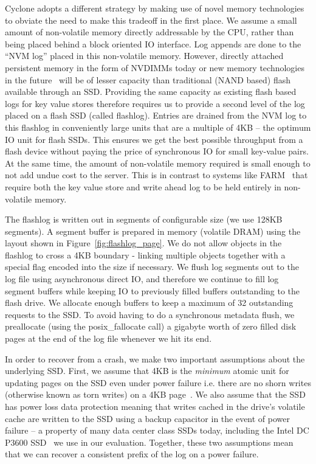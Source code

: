 \documentclass[twocolumn]{article}
\begin{document}
Cyclone adopts a different strategy by making use of novel memory technologies
to obviate the need to make this tradeoff in the first place. We assume a small
amount of non-volatile memory directly addressable by the CPU, rather than being
placed behind a block oriented IO interface. Log appends are done to the ``NVM
log'' placed in this non-volatile memory. However, directly attached persistent 
memory in the form of NVDIMMs today or new memory technologies in the
future~\cite{pmfs} will be of lesser capacity than traditional (NAND based)
flash available through an
SSD. Providing the same capacity as existing flash based logs for key value
stores therefore requires us to provide a second level of the log
placed on a flash SSD (called flashlog).  Entries are drained from
the NVM log to this flashlog in conveniently large units that are a multiple of
4KB -- the optimum IO unit for flash SSDs. This ensures we get the best possible
throughput from a flash device without paying the price of synchronous IO for
small key-value pairs. At the same time, the amount of non-volatile memory
required is small enough to not add undue cost to the server. This is in contrast to
systems like FARM~\cite{farm} that require both the key value store and write ahead log
to be held entirely in non-volatile memory.

The flashlog is written out in segments of configurable size (we use 128KB
segments). A segment buffer is prepared in memory (volatile DRAM) using the
layout shown in Figure~\ref{fig:flashlog_page}. We do not allow objects in the
flashlog to cross a 4KB boundary - linking multiple objects together with a
special flag encoded into the size if necessary. We flush log segments out to
the log file using asynchronous direct IO, and therefore we continue to fill log
segment buffers while keeping IO to previously filled buffers outstanding to the
flash drive. We allocate enough buffers to keep a maximum of 32 outstanding
requests to the SSD. To avoid having to do a synchronous metadata flush, we
preallocate (using the posix\_fallocate call) a gigabyte worth of zero filled
disk pages at the end of the log file whenever we hit its end.

In order to recover from a crash, we make two important assumptions about the
underlying SSD. First, we assume that 4KB is the \emph{minimum} atomic unit for
updating pages on the SSD even under power failure i.e. there are no shorn
writes (otherwise known as torn writes) on a 4KB page~\cite{shorn_writes}. We
also assume that the SSD has power loss data protection meaning that writes
cached in the drive's volatile cache are written to the SSD using a backup
capacitor in the event of power failure -- a property of many data center class
SSDs today, including the Intel DC P3600 SSD~\cite{ssd_spec} we use in our
evaluation. Together, these two assumptions mean that we can recover a
consistent prefix of the log on a power failure.
\end{document}
